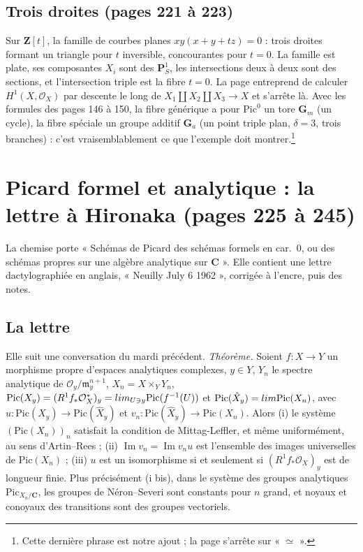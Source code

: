 \documentclass[11pt,a4paper]{article}
\begin{document}
\subsection*{Trois droites (pages 221 à 223)}

Sur $\mathbf{Z}[t]$, la famille de courbes planes $xy(x + y + tz) = 0$ :
trois droites formant un triangle pour $t$ inversible, concourantes pour
$t = 0$. La famille est plate, ses composantes $X_i$ sont des $\mathbf{P}^1_S$,
les intersections deux à deux sont des sections, et l'intersection triple est
la fibre $t = 0$. La page entreprend de calculer $H^1(X, \mathcal{O}_X)$ par
descente le long de $X_1 \amalg X_2 \amalg X_3 \to X$ et s'arrête là. Avec les
formules des pages 146 à 150, la fibre générique a pour $\mathrm{Pic}^0$ un
tore $\mathbf{G}_m$ (un cycle), la fibre spéciale un groupe additif
$\mathbf{G}_a$ (un point triple plan, $\delta = 3$, trois branches) : c'est
vraisemblablement ce que l'exemple doit montrer.\footnote{Cette dernière phrase
est notre ajout ; la page s'arrête sur « $\simeq$ ».}

\section*{Picard formel et analytique : la lettre à Hironaka (pages 225 à 245)}

La chemise porte « Schémas de Picard des schémas formels en car.~0, ou des
schémas propres sur une algèbre analytique sur $\mathbf{C}$ ». Elle contient
une lettre dactylographiée en anglais, « Neuilly July 6 1962 », corrigée à
l'encre, puis des notes.

\subsection*{La lettre}

Elle suit une conversation du mardi précédent. \emph{Théorème.} Soient
$f \colon X \to Y$ un morphisme propre d'espaces analytiques complexes, $y \in Y$,
$Y_n$ le spectre analytique de $\mathcal{O}_y/\mathfrak{m}_y^{n+1}$,
$X_n = X \times_Y Y_n$,
$\mathrm{Pic}(X_y) = (R^1 f_*\mathcal{O}^*_X)_y = \varinjlim_{U \ni y}\mathrm{Pic}(f^{-1}(U))$
et $\mathrm{Pic}(\hat{X}_y) = \varprojlim \mathrm{Pic}(X_n)$, avec
$u \colon \mathrm{Pic}(X_y) \to \mathrm{Pic}(\hat{X}_y)$ et
$v_n \colon \mathrm{Pic}(\hat{X}_y) \to \mathrm{Pic}(X_n)$. Alors (i) le système
$(\mathrm{Pic}(X_n))_n$ satisfait la condition de Mittag-Leffler, et même
uniformément, au sens d'Artin--Rees ; (ii) $\operatorname{Im} v_n = \operatorname{Im} v_n u$
est l'ensemble des images universelles de $\mathrm{Pic}(X_n)$ ; (iii) $u$ est un
isomorphisme si et seulement si $(R^1 f_*\mathcal{O}_X)_y$ est de longueur
finie. Plus précisément (i bis), dans le système des groupes analytiques
$\mathrm{Pic}_{X_n/\mathbf{C}}$, les groupes de Néron--Severi sont constants pour
$n$ grand, et noyaux et conoyaux des transitions sont des groupes vectoriels.
\end{document}
